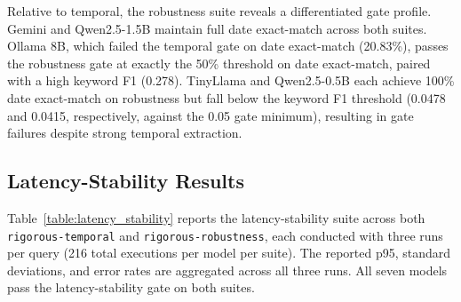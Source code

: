 \documentclass[conference]{IEEEtran}
\begin{document}
Relative to temporal, the robustness suite reveals a differentiated gate profile. Gemini and Qwen2.5-1.5B maintain full date exact-match across both suites. Ollama 8B, which failed the temporal gate on date exact-match (20.83\%), passes the robustness gate at exactly the 50\% threshold on date exact-match, paired with a high keyword F1 (0.278). TinyLlama and Qwen2.5-0.5B each achieve 100\% date exact-match on robustness but fall below the keyword F1 threshold (0.0478 and 0.0415, respectively, against the 0.05 gate minimum), resulting in gate failures despite strong temporal extraction.

\subsection{Latency-Stability Results}

Table~\ref{table:latency_stability} reports the latency-stability suite across both \texttt{rigorous-temporal} and \texttt{rigorous-robustness}, each conducted with three runs per query (216 total executions per model per suite). The reported p95, standard deviations, and error rates are aggregated across all three runs. All seven models pass the latency-stability gate on both suites.
\end{document}

